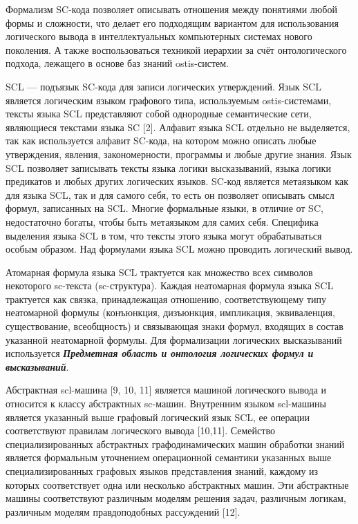 Формализм SC-кода позволяет описывать отношения между понятиями любой формы и сложности, что делает его подходящим вариантом для использования логического вывода в интеллектуальных компьютерных системах нового поколения. А также воспользоваться техникой иерархии за счёт онтологического подхода, лежащего в основе баз знаний ostis-систем.

SCL — подъязык SC-кода для записи логических утверждений. Язык SCL является логическим языком графового типа, используемым ostis-системами, тексты языка SCL представляют собой однородные семантические сети, являющиеся текстами языка SC [2]. Алфавит языка SCL отдельно не выделяется, так как используется алфавит SC-кода, на котором можно описать любые утверждения, явления, закономерности, программы и любые другие знания. Язык SCL позволяет записывать тексты языка логики высказываний, языка логики предикатов и любых других логических языков. SC-код является метаязыком как для языка SCL, так и для самого себя, то есть он позволяет описывать смысл формул, записанных на SCL. Многие формальные языки, в отличие от SC, недостаточно богаты, чтобы быть метаязыком для самих себя. Специфика выделения языка SCL в том, что тексты этого языка могут обрабатываться особым образом. Над формулами языка SCL можно проводить логический вывод.

Атомарная формула языка SCL трактуется как множество всех символов некоторого sc-текста (sc-структура). Каждая неатомарная формула языка SCL трактуется как связка, принадлежащая отношению, соответствующему типу неатомарной формулы (конъюнкция, дизъюнкция, импликация, эквиваленция, существование, всеобщность) и связывающая знаки формул, входящих в состав указанной неатомарной формулы. Для формализации логических высказываний используется \textbf{\textit{Предметная область и онтология логических формул и высказываний}}.

Абстрактная scl-машина [9, 10, 11] является машиной логического вывода и относится к классу абстрактных sc-машин. Внутренним языком scl-машины является указанный выше графовый логический язык SCL, ее операции соответствуют правилам логического вывода [10,11]. Семейство специализированных абстрактных графодинамических машин обработки знаний является формальным уточнением операционной семантики указанных выше специализированных графовых языков представления знаний, каждому из которых соответствует одна или несколько абстрактных машин. Эти абстрактные машины соответствуют различным моделям решения задач, различным логикам, различным моделям правдоподобных рассуждений [12].

